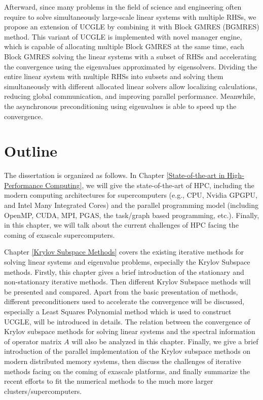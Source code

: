 Afterward, since many problems in the field of science and engineering often require to solve simultaneously large-scale linear systems with multiple RHSs, we propose an extension of UCGLE by combining it with Block GMRES (BGMRES) method. This variant of UCGLE is implemented with novel manager engine, which is capable of allocating multiple Block GMRES at the same time, each Block GMRES solving the linear systems with a subset of RHSs and accelerating the convergence using the eigenvalues approximated by eigensolvers. Dividing the entire linear system with multiple RHSs into subsets and solving them simultaneously with different allocated linear solvers allow localizing calculations, reducing global communication, and improving parallel performance. Meanwhile, the asynchronous preconditioning using eigenvalues is able to speed up the convergence. 



\section{Outline}

The dissertation is organized as follows. In Chapter \ref{State-of-the-art in High-Performance Computing}, we will give the state-of-the-art of HPC, including the modern computing architectures for supercomputers (e.g., CPU, Nvidia GPGPU, and Intel Many Integrated Cores) and the parallel programming model (including OpenMP, CUDA, MPI, PGAS, the task/graph based programming, etc.). Finally, in this chapter, we will talk about the current challenges of HPC facing the coming of exascale supercomputers.

Chapter \ref{Krylov Subspace Methods} covers the existing iterative methods for solving linear systems and eigenvalue problems, especially the Krylov Subspace methods. Firstly, this chapter gives a brief introduction of the stationary and non-stationary iterative methods. Then different Krylov Subspace methods will be presented and compared. Apart from the basic presentation of methods, different preconditioners used to accelerate the convergence will be discussed, especially a Least Squares Polynomial method which is used to construct UCGLE, will be introduced in details. The relation between the convergence of Krylov subspace methods for solving linear systems and the spectral information of operator matrix $A$ will also be analyzed in this chapter. Finally, we give a brief introduction of the parallel implementation of the Krylov subspace methods on modern distributed memory systems, then discuss the challenges of iterative methods facing on the coming of exascale platforms, and finally summarize the recent efforts to fit the numerical methods to the much more larger clusters/supercomputers.

